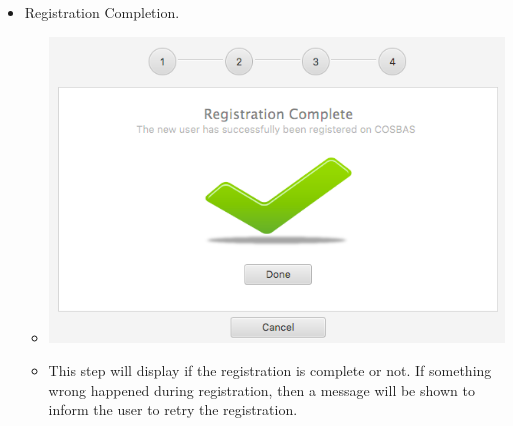 \begin{itemize}
\begin{itemize}
				\item Registration Completion.
				\begin{itemize}
					\item \includegraphics[width=\linewidth]{images/Screenshots/Registration/Reg_Step4.png}
					\item This step will display if the registration is complete or not. If something wrong happened during registration, then a message will be shown to inform the user to retry the registration.
				\end{itemize}
			\end{itemize}
	\end{itemize}